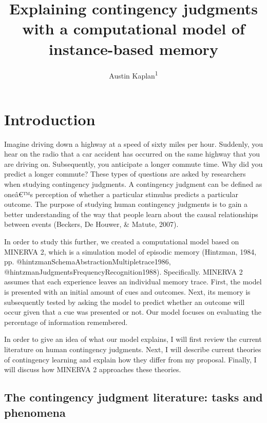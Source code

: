 \documentclass[
  english,
  man,floatsintext]{apa6}
\title{Explaining contingency judgments with a computational model of instance-based memory}
\author{Austin Kaplan\textsuperscript{1}}
\date{}
\affiliation{\vspace{0.5cm}\textsuperscript{1} Brooklyn College}
\begin{document}
\maketitle

\hypertarget{introduction}{%
\section{Introduction}\label{introduction}}

Imagine driving down a highway at a speed of sixty miles per hour. Suddenly, you hear on the radio that a car accident has occurred on the same highway that you are driving on. Subsequently, you anticipate a longer commute time. Why did you predict a longer commute? These types of questions are asked by researchers when studying contingency judgments. A contingency judgment can be defined as oneâ€™s perception of whether a particular stimulus predicts a particular outcome. The purpose of studying human contingency judgments is to gain a better understanding of the way that people learn about the causal relationships between events (Beckers, De Houwer, \& Matute, 2007).

In order to study this further, we created a computational model based on MINERVA 2, which is a simulation model of episodic memory (Hintzman, 1984, pp. @hintzmanSchemaAbstractionMultipletrace1986, @hintzmanJudgmentsFrequencyRecognition1988). Specifically. MINERVA 2 assumes that each experience leaves an individual memory trace. First, the model is presented with an initial amount of cues and outcomes. Next, its memory is subsequently tested by asking the model to predict whether an outcome will occur given that a cue was presented or not. Our model focuses on evaluating the percentage of information remembered.

In order to give an idea of what our model explains, I will first review the current literature on human contingency judgments. Next, I will describe current theories of contingency learning and explain how they differ from my proposal. Finally, I will discuss how MINERVA 2 approaches these theories.

\hypertarget{the-contingency-judgment-literature-tasks-and-phenomena}{%
\subsection{The contingency judgment literature: tasks and phenomena}\label{the-contingency-judgment-literature-tasks-and-phenomena}}
\end{document}

